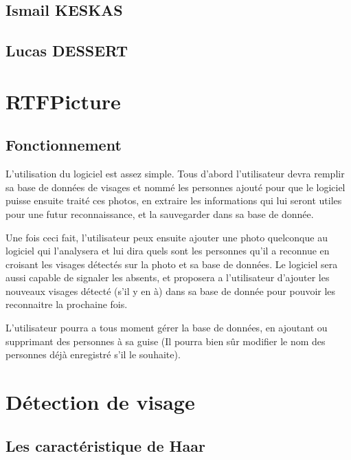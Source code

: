 \documentclass[12pt,a4paper]{article}
\begin{document}
\subsection{Ismail KESKAS}


\subsection{Lucas DESSERT}




\newpage
\section{RTFPicture}
\subsection{Fonctionnement}

L'utilisation du logiciel est assez simple. Tous d'abord l'utilisateur devra remplir sa base de données de visages et nommé les personnes ajouté pour que le logiciel puisse ensuite traité ces photos, en extraire les informations qui lui seront utiles pour une futur reconnaissance, et la sauvegarder dans sa base de donnée.

Une fois ceci fait, l'utilisateur peux ensuite ajouter une photo quelconque au logiciel qui l'analysera et lui dira quels sont les personnes qu'il a reconnue en croisant les visages détectés sur la photo et sa base de données. Le logiciel sera aussi capable de signaler les absents, et proposera a l'utilisateur d'ajouter les nouveaux visages détecté (s'il y en à) dans sa base de donnée pour pouvoir les reconnaitre la prochaine fois.

L'utilisateur pourra a tous moment gérer la base de données, en ajoutant ou supprimant des personnes à sa guise (Il pourra bien sûr modifier le nom des personnes déjà enregistré s'il le souhaite).



\newpage
\section{Détection de visage}



\subsection{Les caractéristique de Haar}
\end{document}
